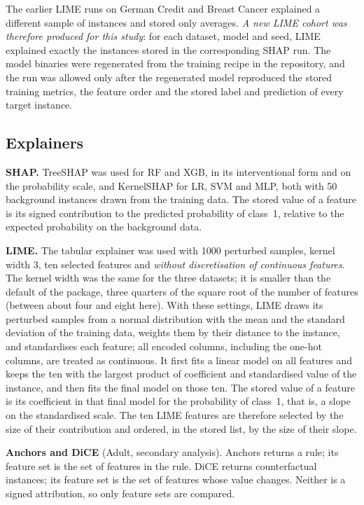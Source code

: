\documentclass{cys}
\begin{document}
The earlier LIME runs on German Credit and Breast Cancer explained a different sample of
instances and stored only averages. \emph{A new LIME cohort was therefore produced for
this study}: for each dataset, model and seed, LIME explained exactly the instances
stored in the corresponding SHAP run. The model binaries were regenerated from the
training recipe in the repository, and the run was allowed only after the regenerated
model reproduced the stored training metrics, the feature order and the stored label and
prediction of every target instance.

\subsection{Explainers}
\label{sec:methods:explainers}

\textbf{SHAP.} TreeSHAP \cite{lundberg2020local} was used for RF and XGB, in its
interventional form and on the probability scale, and KernelSHAP
\cite{lundberg2017unified} for LR, SVM and MLP, both with 50 background instances drawn
from the training data. The stored value of a feature is its signed contribution to the
predicted probability of class~1, relative to the expected probability on the background
data.

\textbf{LIME.} The tabular explainer \cite{ribeiro2016why} was used with 1000 perturbed
samples, kernel width 3, ten selected features and \emph{without discretisation of
continuous features}. The kernel width was the same for the three datasets; it is smaller
than the default of the package, three quarters of the square root of the number of
features (between about four and eight here). With these settings, LIME draws its perturbed samples from a normal distribution
with the mean and the standard deviation of the training data, weights them by their
distance to the instance, and standardises each feature; all encoded columns, including
the one-hot columns, are treated as continuous. It first fits a linear model on all
features and keeps the ten with the largest product of coefficient and standardised value
of the instance, and then fits the final model on those ten. The stored value of a
feature is its coefficient in that final model for the probability of class~1, that is, a
slope on the standardised scale. The ten LIME features are therefore selected by the size
of their contribution and ordered, in the stored list, by the size of their slope.

\textbf{Anchors and DiCE} (Adult, secondary analysis). Anchors
\cite{ribeiro2018anchors} returns a rule; its feature set is the set of features in the
rule. DiCE \cite{mothilal2020dice} returns counterfactual instances; its feature set is
the set of features whose value changes. Neither is a signed attribution, so only
feature sets are compared.
\end{document}
